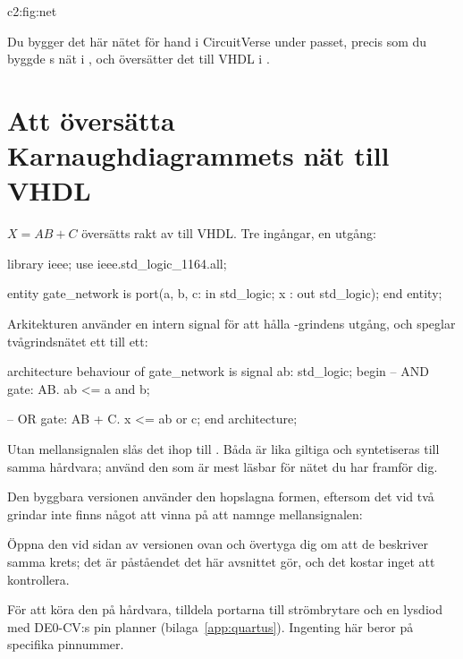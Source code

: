 {c2:fig:net}

Du bygger det här nätet för hand i CircuitVerse under passet, precis som du byggde
s nät i , och översätter det till VHDL i .

\section{Att översätta Karnaughdiagrammets nät till VHDL}
\label{c2:sec:tovhdl}

$X = AB + C$ översätts rakt av till VHDL. Tre ingångar, en utgång:

\begin{vhdlcode}
library ieee;
use ieee.std_logic_1164.all;

entity gate_network is
    port(a, b, c: in std_logic;
         x      : out std_logic);
end entity;
\end{vhdlcode}

Arkitekturen använder en intern signal  för att hålla -grindens utgång, och
speglar tvågrindsnätet ett till ett:

\begin{vhdlcode}
architecture behaviour of gate_network is
signal ab: std_logic;
begin
    -- AND gate: AB.
    ab <= a and b;

    -- OR gate: AB + C.
    x <= ab or c;
end architecture;
\end{vhdlcode}

Utan mellansignalen slås det ihop till . Båda är lika giltiga och
syntetiseras till samma hårdvara; använd den som är mest läsbar för nätet du har framför dig.

Den byggbara versionen använder den hopslagna formen, eftersom det vid två grindar inte finns
något att vinna på att namnge mellansignalen:


Öppna den vid sidan av versionen ovan och övertyga dig om att de beskriver samma krets; det är
påståendet det här avsnittet gör, och det kostar inget att kontrollera.

För att köra den på hårdvara, tilldela portarna till strömbrytare och en lysdiod med DE0-CV:s pin
planner (bilaga~\ref{app:quartus}). Ingenting här beror på specifika pinnummer.

